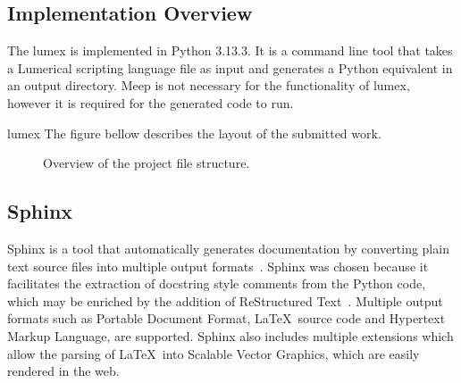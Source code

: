\subsection{Implementation Overview}

The \gls{lumex} is implemented in Python 3.13.3. It is a command line tool that takes a Lumerical scripting language file as input and generates a Python equivalent in an output directory. Meep is not necessary for the functionality of \gls{lumex}, however it is required for the generated code to run. 


\gls{lumex} 
The figure bellow describes the layout of the submitted work. 

\begin{figure}[H]\label{fig:project-structure}
\centering
{}

\caption{Overview of the project file structure.}
\end{figure}

\subsection{Sphinx}
Sphinx is a tool that automatically generates documentation by converting plain text source files into multiple output formats~\cite{sphinx_quickstart}. Sphinx was chosen because it facilitates the extraction of docstring style comments from the Python code, which may be enriched by the addition of ReStructured Text~\cite{docutils_rst}. Multiple output formats such as Portable Document Format, \LaTeX \ source code and Hypertext Markup Language, are supported. Sphinx also includes multiple extensions which allow the parsing of \LaTeX \ into Scalable Vector Graphics, which are easily rendered in the web.

